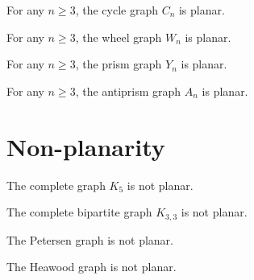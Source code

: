 \begin{theorem}\label{thm:cycle}
\leanok
{}
For any $n \geq 3$, the cycle graph $C_n$ is planar.
\end{theorem}

\begin{theorem}\label{thm:wheel}
\leanok
{}
For any $n \geq 3$, the wheel graph $W_n$ is planar.
\end{theorem}

\begin{theorem}\label{thm:prism}
\leanok
{}
For any $n \geq 3$, the prism graph $Y_n$ is planar.
\end{theorem}

\begin{theorem}\label{thm:antiprism}
\leanok
{}
For any $n \geq 3$, the antiprism graph $A_n$ is planar.
\end{theorem}

\section{Non-planarity}

\begin{theorem}\label{thm:k5}
\leanok
{}
The complete graph $K_5$ is not planar.
\end{theorem}

\begin{theorem}\label{thm:k33}
\leanok
{}
The complete bipartite graph $K_{3,3}$ is not planar.
\end{theorem}

\begin{theorem}\label{thm:petersen}
\leanok
{}
The Petersen graph is not planar.
\end{theorem}

\begin{theorem}\label{thm:heawood}
\leanok
{}
The Heawood graph is not planar.
\end{theorem}

